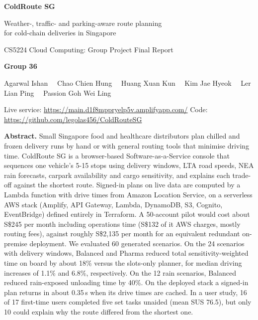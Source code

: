 \documentclass[10.5pt,a4paper]{article}
\newcommand{\Sd}{S\$}
\begin{document}
\begin{titlepage}
\centering
\vspace*{0.4cm}
{\Huge\bfseries ColdRoute SG\par}
\vspace{0.25cm}
{\large Weather-, traffic- and parking-aware route planning\\ for cold-chain deliveries in Singapore\par}
\vspace{0.45cm}
{\normalsize CS5224 Cloud Computing: Group Project Final Report\par}
\vspace{0.35cm}
{\bfseries Group 36\par}
\vspace{0.15cm}
{\small Agarwal Ishan \ \textperiodcentered\  Chao Chien Hung \ \textperiodcentered\  Huang Xuan Kun \ \textperiodcentered\  Kim Jae Hyeok \ \textperiodcentered\  Ler Lian Ping \ \textperiodcentered\  Passion Goh Wei Ling\par}
\vspace{0.3cm}
{\small Live service: \url{https://main.d1f8mppryelp5v.amplifyapp.com/}\quad
Code: \url{https://github.com/legolas456/ColdRouteSG}\par}
\vspace{0.3cm}
\begin{minipage}{0.9\linewidth}
\small\textbf{Abstract.} Small Singapore food and healthcare distributors plan chilled and frozen delivery runs
by hand or with general routing tools that minimise driving time. ColdRoute SG is a browser-based Software-as-a-Service
console that sequences one vehicle's 5-15 stops using delivery windows, LTA road speeds, NEA rain forecasts,
carpark availability and cargo sensitivity, and explains each trade-off against the shortest route. Signed-in plans on
live data are computed by a Lambda function with drive times from Amazon Location Service, on a serverless AWS stack
(Amplify, API Gateway, Lambda, DynamoDB, S3, Cognito, EventBridge) defined entirely in Terraform. A 50-account pilot would
cost about \Sd245 per month including operations time (\Sd132 of it AWS charges, mostly routing fees), against roughly \Sd2,135 per month for an equivalent redundant on-premise deployment.
We evaluated 60 generated scenarios. On the 24 scenarios with delivery windows, Balanced and Pharma reduced total sensitivity-weighted time on board by about 18\% versus the slots-only planner, for median driving increases of 1.1\% and 6.8\%, respectively. On the 12 rain scenarios, Balanced reduced rain-exposed unloading time by 40\%. On the deployed stack a signed-in plan returns in about 0.35\,s when its drive times are cached. In a user study, 16 of 17 first-time users completed five set tasks unaided (mean SUS 76.5), but only 10 could explain why the route differed from the shortest one.
\end{minipage}


\end{titlepage}
\end{document}
